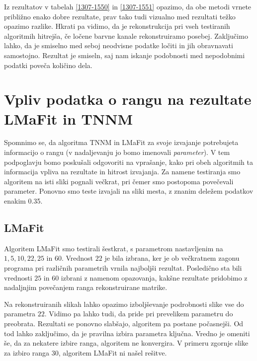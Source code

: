 \FloatBarrier

Iz rezultatov v  tabelah \ref{1307-1550} in \ref{1307-1551} opazimo, da obe metodi vrnete približno enako dobre rezultate, 
prav tako tudi vizualno med rezultati težko opazimo razlike.
Hkrati pa vidimo, da je rekonstrukcija pri vseh testiranih algoritmih hitrejša, če ločene barvne kanale rekonstruiramo posebej.  Zaključimo lahko, da je smiselno med seboj neodvisne podatke ločiti in jih obravnavati samostojno. Rezultat je smiseln, saj nam iskanje podobnosti med nepodobnimi podatki poveča količino dela.

\section{Vpliv podatka o rangu na rezultate LMaFit in TNNM} \label{1307-2253}
Spomnimo se, da algoritma TNNM in LMaFit za svoje izvajanje potrebujeta informacijo o rangu (v nadaljevanju jo bomo imenovali \textit{parameter}). V tem podpoglavju bomo poskušali odgovoriti na vprašanje, kako pri obeh algoritmih ta informacija vpliva na rezultate in hitrost izvajanja. Za namene testiranja smo algoritem na isti sliki pognali večkrat, pri čemer smo postopoma povečevali parameter. Ponovno smo teste izvajali na sliki mesta, z znanim deležem podatkov enakim 0.35.

\subsection{LMaFit}
Algoritem LMaFit smo testirali šestkrat, s parametrom nastavljenim na
$1, 5, 10, 22, 25$ in $60$. Vrednost $22$ je bila izbrana, ker je ob večkratnem zagonu programa pri različnih parametrih vrnila najboljši rezultat. Posledično sta bili vrednosti $25$ in $60$ izbrani z namenom opazovanja, kakšne rezultate pridobimo z nadaljnjim povečanjem ranga rekonstruirane matrike. 

\FloatBarrier
Na rekonstruiranih slikah lahko opazimo izboljševanje podrobnosti slike vse do parametra $22$. Vidimo pa lahko tudi, da pride pri prevelikem parametru do preobrata. Rezultati se ponovno slabšajo, algoritem pa postane počasnejši. Od tod lahko zaključimo, da je pravilna izbira parametra ključna. Vredno je omeniti še, da za nekatere izbire ranga, algoritem ne konvergira. V primeru zgornje slike za izbiro ranga $30$, algoritem LMaFit ni našel rešitve.

